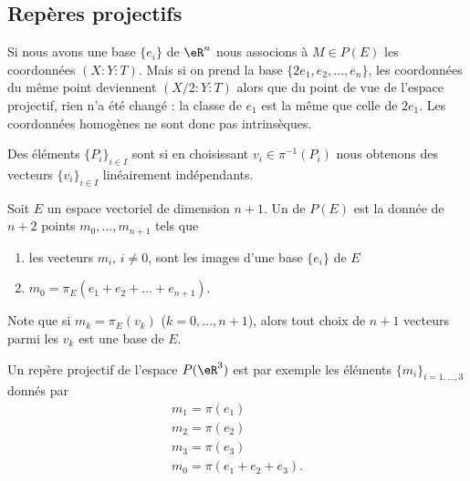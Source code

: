 \subsection{Repères projectifs}

Si nous avons une base \( \{ e_i \}\) de \( \eR^n\) nous associons à \( M\in P(E)\) les coordonnées \( (X:Y:T)\). Mais si on prend la base \( \{ 2e_1,e_2,\ldots, e_n \}\), les coordonnées du même point deviennent \( (X/2:Y:T)\) alors que du point de vue de l'espace projectif, rien n'a été changé : la classe de \( e_1\) est la même que celle de \( 2e_1\). Les coordonnées homogènes ne sont donc pas intrinsèques.

\begin{definition}
    Des éléments \( \{ P_i \}_{i\in I}\) sont  si en choisissant \( v_i\in\pi^{-1}(P_i)\) nous obtenons des vecteurs \( \{ v_i \}_{i\in I}\) linéairement indépendants.
\end{definition}

\begin{definition}      \label{DEFooPZKFooDBXtEn}
    Soit \( E\) un espace vectoriel de dimension \( n+1\). Un  de \( P(E)\) est la donnée de \( n+2\) points \( m_0,\ldots, m_{n+1}\) tels que
    \begin{enumerate}
        \item
            les vecteurs \( m_i\), \( i\neq 0\), sont les images d'une base \( \{ e_i \}\) de \( E\)
        \item
            \( m_0=\pi_E(e_1+e_2+\ldots +e_{n+1})\).
    \end{enumerate}
\end{definition}
Note que si \( m_k=\pi_E(v_k)\) (\( k=0,\ldots, n+1\)), alors tout choix de \( n+1\) vecteurs parmi les \( v_k\) est une base de \( E\).

\begin{example}
    Un repère projectif de l'espace \( P(\eR^3)\) est par exemple les éléments \( \{ m_i \}_{i=1,\ldots, 3}\) donnés par
    \begin{subequations}
        \begin{align}
            m_1=\pi(e_1)\\
            m_2=\pi(e_2)\\
            m_3=\pi(e_3)\\
            m_0=\pi(e_1+e_2+e_3).
        \end{align}
    \end{subequations}
\end{example}


